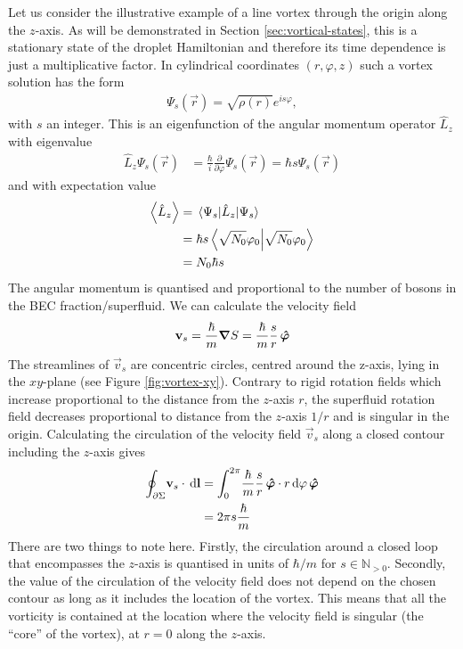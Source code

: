 			Let us consider the illustrative example of a line vortex through the origin along the $z$-axis. As will be demonstrated in Section \ref{sec:vortical-states}, this is a stationary state of the droplet Hamiltonian and therefore its time dependence is just a multiplicative factor. In cylindrical coordinates $(r,\varphi,z)$ such a vortex solution has the form
			\begin{align}
				\Psi_s(\vec{r}) = \sqrt{\rho(r)}\unit{e}^{is\varphi}, \label{eq:line-vortex}
			\end{align}
			with $s$ an integer. This is an eigenfunction of the angular momentum operator $\hat{L}_z$ with eigenvalue
			\begin{align}
				\hat{L}_z \Psi_s(\vec{r}) &= \frac{\hbar}{i}\frac{\partial}{\partial\varphi}\Psi_s(\vec{r}) = \hbar s\Psi_s(\vec{r})
			\end{align}
			and with expectation value
			\begin{align}
				\expval{\hat{L}_z} &= \expval{\hat{L}_z}{\Psi_s} \\
					&= \hbar s \braket{\sqrt{N_0}\varphi_0} \\
					&= N_0\hbar s
			\end{align}
			The angular momentum is quantised and proportional to the number of bosons in the BEC fraction/superfluid. We can calculate the velocity field
			\begin{align}
				\bm{\mathrm{v}}_s = \frac{\hbar}{m}\grad{S} = \frac{\hbar}{m}\frac{s}{r}\,\vu*{\varphi}
			\end{align}
			The streamlines of $\vec{v}_s$ are concentric circles, centred around the z-axis, lying in the $xy$-plane (see Figure \ref{fig:vortex-xy}). Contrary to rigid rotation fields which increase proportional to the distance from the $z$-axis $r$, the superfluid rotation field decreases proportional to distance from the $z$-axis $1/r$ and is singular in the origin. Calculating the circulation of the velocity field $\vec{v}_s$ along a closed contour including the $z$-axis gives
			\begin{align}
				\oint_{\partial\Sigma}\!\bm{\mathrm{v}}_s\cdot\,\mathrm{d}\bm{\mathrm{l}} &=
				\int_{0}^{2\pi}\!\frac{\hbar}{m}\frac{s}{r}\,\vu*{\varphi}\cdot r\,\mathrm{d}\varphi\,\vu*{\varphi} \\
					&= 2\pi s\frac{\hbar}{m}
			\end{align}
			There are two things to note here. Firstly, the circulation around a closed loop that encompasses the $z$-axis is quantised in units of $\hbar/m$ for $s\in\mathbb{N}_{>0}$. Secondly, the value of the circulation of the velocity field does not depend on the chosen contour as long as it includes the location of the vortex. This means that all the vorticity is contained at the location where the velocity field is singular (the ``core'' of the vortex), at $r=0$ along the $z$-axis.
			
